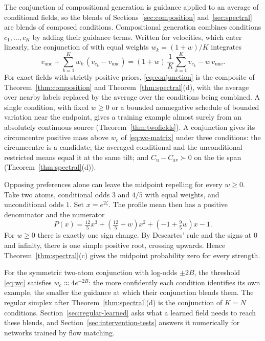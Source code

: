 \documentclass{article} %
\theoremstyle{plain}
\theoremstyle{definition}
\theoremstyle{remark}
\begin{document}
The conjunction of compositional generation is guidance applied to an average of conditional
fields, so the blends of Sections~\ref{sec:composition} and~\ref{sec:spectral} are blends of
composed conditions. Compositional generation combines conditions $c_1,\dots,c_K$ by adding
their guidance terms. Written for velocities, which enter linearly, the conjunction of
\citet{liu2022composable} with equal weights $w_k=(1+w)/K$ integrates
\begin{equation}
v_{\mathrm{unc}}+\sum_{k=1}^Kw_k\,(v_{c_k}-v_{\mathrm{unc}})
=(1+w)\,\frac1K\sum_{k=1}^Kv_{c_k}-w\,v_{\mathrm{unc}} .
\label{eq:conjunction}
\end{equation}
For exact fields with strictly positive priors, \eqref{eq:conjunction} is the composite of
Theorem~\ref{thm:composition} and Theorem~\ref{thm:spectral}(d), with the average over nearby
labels replaced by the average over the conditions being combined. A single condition, with fixed
$w\ge0$ or a bounded nonnegative schedule of bounded variation near the endpoint, gives a
training example almost surely from an absolutely continuous source
(Theorem~\ref{thm:twofields}). A conjunction gives its circumcentre positive mass above $w_c$ of
\eqref{eq:wc-matrix} under three conditions: the circumcentre is a candidate; the averaged
conditional and the unconditional restricted means equal it at the same tilt; and
$C_{\mathrm u}-C_{\mathrm{av}}\succ0$ on the tie span (Theorem~\ref{thm:spectral}(d)).

Opposing preferences alone can leave the midpoint repelling for every $w\ge0$. Take two atoms,
conditional odds $3$ and $4/5$ with equal weights, and unconditional odds $1$. Set
$x=e^{2\zeta}$. The profile mean then has a positive denominator and the numerator
\[
P(x)=\tfrac{12}{5}x^3+(\tfrac{12}{5}+w)x^2+(-1+\tfrac95 w)x-1 .
\]
For $w\ge0$ there is exactly one sign change. By Descartes' rule and the signs at $0$ and
infinity, there is one simple positive root, crossing upwards. Hence
Theorem~\ref{thm:spectral}(c) gives the midpoint probability zero for every strength.

For the symmetric two-atom conjunction with log-odds $\pm2B$, the threshold \eqref{eq:wc}
satisfies $w_c\approx4e^{-2B}$: the more confidently each condition identifies its own example, the smaller the guidance at which their conjunction
blends them. The regular simplex after Theorem~\ref{thm:spectral}(d) is the conjunction of
$K=N$ conditions. Section~\ref{sec:regular-learned} asks what a learned field needs to reach these
blends, and Section~\ref{sec:intervention-tests} answers it numerically for networks trained by
flow matching.
\end{document}

